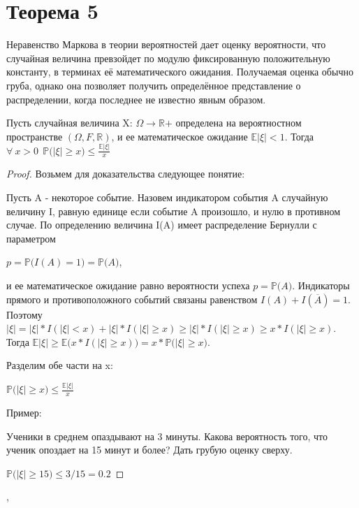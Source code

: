 \documentclass[a4paper,12pt]{article}
\begin{document}
    \section {Теорема 5}
    \begin{theorem}
   Неравенство Маркова в теории вероятностей дает оценку вероятности, что случайная величина превзойдет по модулю фиксированную положительную константу, в терминах её математического ожидания. Получаемая оценка обычно груба, однако она позволяет получить определённое представление о распределении, когда последнее не известно явным образом.
   
   Пусть случайная величина X: $\Omega \rightarrow \mathbb R\mathrm+$ определена на вероятностном пространстве $(\Omega, F, \mathbb R)$, и ее математическое ожидание $\mathbb E\mathrm |\xi|<\mathcal {1}$. Тогда
 $\forall ~x > 0~~ \mathbb P\mathrm(|\xi| \ge x)\le \frac {\mathbb E\mathrm |\xi|}{x}$
 
    \end{theorem}
    \begin{proof}
    
    Возьмем для доказательства следующее понятие:
    
Пусть A - некоторое событие. Назовем индикатором события A случайную величину I, равную единице если событие A произошло, и нулю в противном случае. По определению величина I(A) имеет распределение Бернулли с параметром

 $p = \mathbb P\mathrm (I(A) = 1) = \mathbb P\mathrm (A)$, 
 
и ее математическое ожидание равно вероятности успеха  $p = \mathbb P\mathrm (A)$. Индикаторы прямого и противоположного событий связаны равенством $I(A) + I(\overline A) = 1$. Поэтому
 $|\xi|=|\xi|*I(|\xi|<x)+|\xi|*I(|\xi|\ge x)\ge |\xi|*I(|\xi|\ge x)\ge x*I(|\xi| \ge x)$.
Тогда
 $\mathbb E\mathrm |\xi|\ge \mathbb E\mathrm(x*I(|\xi|\ge x)) = x*\mathbb P\mathrm (|\xi|\ge x)$.
 
Разделим обе части на x:

$\mathbb P\mathrm(|\xi| \ge x)\le \frac {\mathbb E\mathrm |\xi|}{x}$

Пример:

Ученики в среднем опаздывают на 3 минуты. Какова вероятность того, что ученик опоздает на 15 минут и более? Дать грубую оценку сверху.

 $\mathbb P\mathrm (|\xi|\ge 15)\le 3/15 = 0.2$
    
    \end{proof}
    \sep
\end{document}
